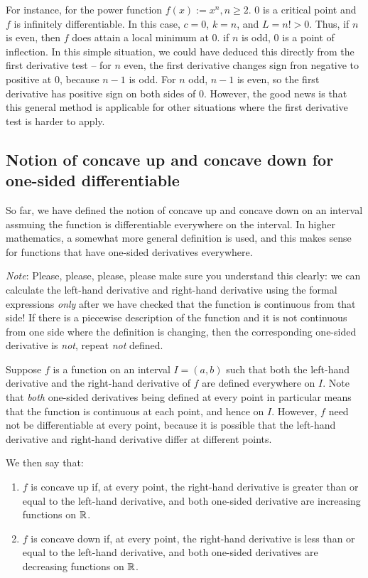 \documentclass[10pt]{amsart}
\begin{document}
For instance, for the power function $f(x) := x^n, n \ge 2$. $0$ is a
critical point and $f$ is infinitely differentiable. In this case, $c
= 0$, $k = n$, and $L = n! > 0$. Thus, if $n$ is even, then $f$ does
attain a local minimum at $0$. if $n$ is odd, $0$ is a point of
inflection. In this simple situation, we could have deduced this
directly from the first derivative test -- for $n$ even, the first
derivative changes sign fron negative to positive at $0$, because $n -
1$ is odd. For $n$ odd, $n - 1$ is even, so the first derivative has
positive sign on both sides of $0$. However, the good news is that
this general method is applicable for other situations where the first
derivative test is harder to apply.

\subsection{Notion of concave up and concave down for one-sided differentiable}

So far, we have defined the notion of concave up and concave down on
an interval assmuing the function is differentiable everywhere on the
interval. In higher mathematics, a somewhat more general definition is
used, and this makes sense for functions that have one-sided
derivatives everywhere.

{\em Note}: Please, please, please, please make sure you understand
this clearly: we can calculate the left-hand derivative and right-hand
derivative using the formal expressions {\em only} after we have
checked that the function is continuous from that side! If there is a
piecewise description of the function and it is not continuous from
one side where the definition is changing, then the corresponding
one-sided derivative is {\em not}, repeat {\em not} defined.

Suppose $f$ is a function on an interval $I = (a,b)$ such that both
the left-hand derivative and the right-hand derivative of $f$ are
defined everywhere on $I$. Note that {\em both} one-sided derivatives
being defined at every point in particular means that the function is
continuous at each point, and hence on $I$. However, $f$ need not be
differentiable at every point, because it is possible that the
left-hand derivative and right-hand derivative differ at different
points.

We then say that:

\begin{enumerate}
\item $f$ is concave up if, at every point, the right-hand derivative
  is greater than or equal to the left-hand derivative, and both
  one-sided derivative are increasing functions on $\mathbb{R}$.
\item $f$ is concave down if, at every point, the right-hand
  derivative is less than or equal to the left-hand derivative, and
  both one-sided derivatives are decreasing functions on $\mathbb{R}$.
\end{enumerate}
\end{document}
